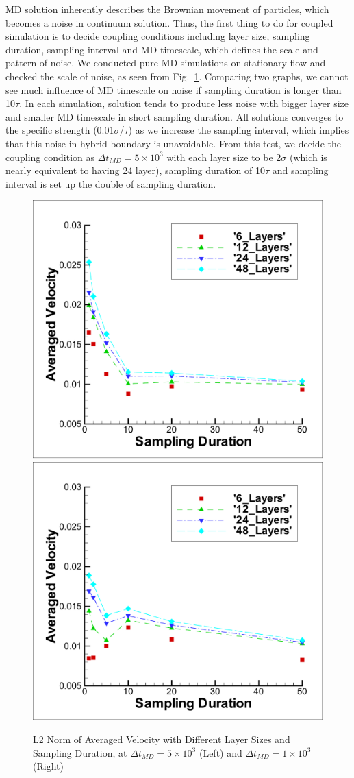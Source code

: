\documentclass{CFD2010paper}
\begin{document}
MD solution inherently describes the Brownian movement of particles, which becomes a noise in continuum solution. Thus, the first thing to do for coupled simulation is to decide coupling conditions including layer size, sampling duration, sampling interval and MD timescale, which defines the scale and pattern of noise. We conducted pure MD simulations on stationary flow and checked the scale of noise, as seen from Fig.~\ref{MD_Regular_Vel0}. Comparing two graphs, we cannot see much influence of MD timescale on noise if sampling duration is longer than 10$\tau$. In each simulation, solution tends to produce less noise with bigger layer size and smaller MD timescale in short sampling duration. All solutions converges to the specific strength (0.01$\sigma$/$\tau$) as we increase the sampling interval, which implies that this noise in hybrid boundary is unavoidable. From this test, we decide the coupling condition as $\Delta{t_{MD}}=5\times{10^{3}}$ with each layer size to be 2$\sigma$ (which is nearly equivalent to having 24 layer), sampling duration of 10$\tau$ and sampling interval is set up the double of sampling duration.

%
\begin{figure}[ht]
\centering
\includegraphics[width=0.4\linewidth]{MD_Regular_Vel0_5e-3.pdf}
\hskip 1cm
\includegraphics[width=0.4\linewidth]{MD_Regular_Vel0_1e-3.pdf}
\vskip-0.2cm
\caption{L2 Norm of Averaged Velocity with Different Layer Sizes and Sampling Duration, at $\Delta{t_{MD}}=5\times{10^{3}}$ (Left) and $\Delta{t_{MD}}=1\times{10^{3}}$ (Right)}
\label{MD_Regular_Vel0}
\end{figure}
\end{document}

